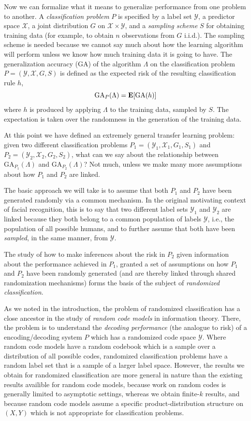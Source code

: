 \documentclass[12pt]{article}
\begin{document}
Now we can formalize what it means to generalize performance from one
problem to another.  A \emph{classification problem} $P$ is specified
by a label set $\mathcal{Y}$, a predictor space $\mathcal{X}$, a joint
distribution $G$ on $\mathcal{X} \times \mathcal{Y}$, and a
\emph{sampling scheme} $S$ for obtaining training data (for example,
to obtain $n$ observations from $G$ i.i.d.).  The sampling scheme is
needed because we cannot say much about how the learning algorithm
will perform unless we know how much training data it is going to
have.  The generalization accuracy (GA) of the algorithm $\Lambda$ on the
classification problem $P = (\mathcal{Y}, \mathcal{X}, G, S)$ is
defined as the expected risk of the resulting classification rule $h$,
\[
\text{GA}_P(\Lambda) = \textbf{E}[\text{GA}(h)]
\]
where $h$ is produced by applying $\Lambda$ to the training data,
sampled by $S$.  The expectation is taken over the randomness in the
generation of the training data.

At this point we have defined an extremely general transfer learning
problem: given two different classification problems $P_1 =
(\mathcal{Y}_1, \mathcal{X}_1, G_1, S_1)$ and $P_2 = (\mathcal{Y}_2,
\mathcal{X}_2, G_2, S_2)$, what can we say about the relationship
between $\text{GA}_{P_1}(\Lambda)$ and $\text{GA}_{P_2}(\Lambda)$?
Not much, unless we make many more assumptions about how $P_1$ and
$P_2$ are linked.

The basic approach we will take is to assume that both $P_1$ and $P_2$
have been generated randomly via a common mechanism.  In the original
motivating context of facial recognition, this is to say that two
different label sets $\mathcal{Y}_1$ and $\mathcal{Y}_2$ are linked
because they both belong to a common population of labels
$\mathcal{Y}$, i.e., the population of all possible humans, and to
further assume that both have been \emph{sampled}, in the same manner,
from $\mathcal{Y}$.

The study of how to make inferences about the risk in $P_2$ given
information about the performance achieved in $P_1$, granted a set of
assumptions on how $P_1$ and $P_2$ have been randomly generated (and
are thereby linked through shared randomization mechanisms) forms the
basis of the subject of \emph{randomized classification}.

As we noted in the introduction, the problem of randomized
classification has a close ancestor in the study of \emph{random code
  models} in information theory.  There, the problem is to understand
the \emph{decoding performance} (the analogue to risk) of a
encoding/decoding system $P$ which has a randomized code space
$\mathcal{Y}$.  Where random code models have a random codebook which
is a sample over a distribution of all possible codes, randomized
classification problems have a random label set that is a sample of a
larger label space.  However, the results we obtain for randomized
classification are more general in nature than the existing results
availible for random code models, because work on random codes is
generally limited to asymptotic settings, whereas we obtain finite-$k$
results, and because random code models assume a specific
product-distribution structure on $(X, Y)$ which is not appropriate
for classification problems.
\end{document}
